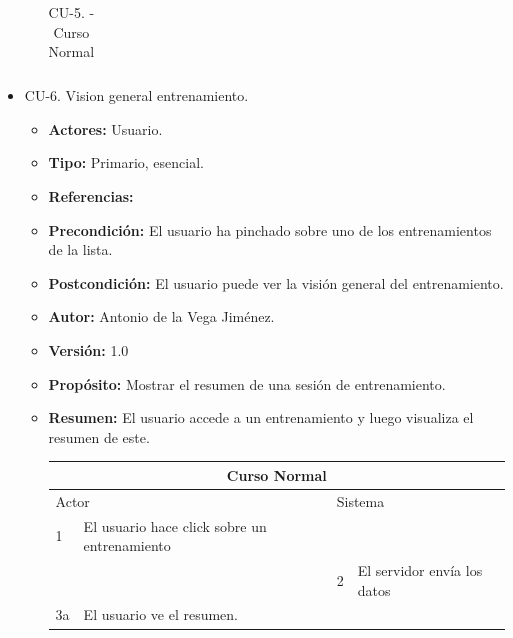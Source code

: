 \begin{itemize}
\begin{itemize}
\begin{table}[H]
\begin{tabularx}{\textwidth}{|l|X|l|X|}
      \end{tabularx}
      \caption{CU-5. - Curso Normal}
      \label{my-label}
    \end{table}
  \end{itemize}
  \item CU-6. Vision general entrenamiento.
  \begin{itemize}
    \item \textbf{Actores:} Usuario.
    \item \textbf{Tipo:} Primario, esencial.
    \item \textbf{Referencias:}
    \item \textbf{Precondición:} El usuario ha pinchado sobre uno de los entrenamientos de la lista.
    \item \textbf{Postcondición:} El usuario puede ver la visión general del entrenamiento.
    \item \textbf{Autor:} Antonio de la Vega Jiménez.
    \item \textbf{Versión:} 1.0
    \item \textbf{Propósito:} Mostrar el resumen de una sesión de entrenamiento.
    \item \textbf{Resumen:} El usuario accede a un entrenamiento y luego visualiza el resumen de este.
    \begin{table}[H]
      \centering
      \begin{tabularx}{\textwidth}{|l|X|l|X|}
        \hline
        \multicolumn{4}{|c|}{\cellcolor[HTML]{C0C0C0}Curso Normal}                                                 \\ \hline
        \multicolumn{2}{|l|}{\cellcolor[HTML]{EFEFEF}Actor} & \multicolumn{2}{l|}{\cellcolor[HTML]{EFEFEF}Sistema} \\ \hline
        1                         & El usuario hace click sobre un entrenamiento                       &                            &                         \\ \hline
                                  &                         & 2                          & El servidor envía los datos                     \\ \hline
        3a                         & El usuario ve el resumen.      &                          &                        \\ \hline
                                  

\end{tabularx}
\end{table}
\end{itemize}
\end{itemize}
